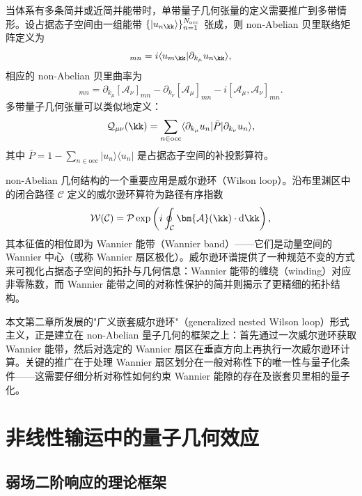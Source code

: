 当体系有多条简并或近简并能带时，单带量子几何张量的定义需要推广到多带情形。设占据态子空间由一组能带 $\{|u_{n\kk}\rangle\}_{n=1}^{N_\mathrm{occ}}$ 张成，则 non-Abelian 贝里联络矩阵定义为\cite{PhysRevLett.114.206401}
\begin{equation}
  [\mathcal{A}_\mu(\kk)]_{mn} = i\langle u_{m\kk} | \partial_{k_\mu} u_{n\kk} \rangle,
\end{equation}
相应的 non-Abelian 贝里曲率为
\begin{equation}
  [\mathcal{F}_{\mu\nu}]_{mn} = \partial_{k_\mu} [\mathcal{A}_\nu]_{mn} - \partial_{k_\nu} [\mathcal{A}_\mu]_{mn} - i[\mathcal{A}_\mu, \mathcal{A}_\nu]_{mn}.
\end{equation}
多带量子几何张量可以类似地定义：
\begin{equation}
  \mathcal{Q}_{\mu\nu}(\kk) = \sum_{n \in \mathrm{occ}} \langle \partial_{k_\mu} u_n | \bar{P} | \partial_{k_\nu} u_n \rangle,
\end{equation}
其中 $\bar{P} = 1 - \sum_{n \in \mathrm{occ}} |u_n\rangle\langle u_n|$ 是占据态子空间的补投影算符。

non-Abelian 几何结构的一个重要应用是威尔逊环（Wilson loop）。沿布里渊区中的闭合路径 $\mathcal{C}$ 定义的威尔逊环算符为路径有序指数
\begin{equation}
  \mathcal{W}(\mathcal{C}) = \mathcal{P} \exp\left( i \oint_{\mathcal{C}} \bm{\mathcal{A}}(\kk) \cdot \mathrm{d}\kk \right),
\end{equation}
其本征值的相位即为 Wannier 能带（Wannier band）——它们是动量空间的 Wannier 中心（或称 Wannier 扇区极化）。威尔逊环谱提供了一种规范不变的方式来可视化占据态子空间的拓扑与几何信息：Wannier 能带的缠绕（winding）对应非零陈数，而 Wannier 能带之间的对称性保护的简并则揭示了更精细的拓扑结构\cite{alexey1,alexey2}。

本文第二章所发展的"广义嵌套威尔逊环"（generalized nested Wilson loop）形式主义，正是建立在 non-Abelian 量子几何的框架之上：首先通过一次威尔逊环获取 Wannier 能带，然后对选定的 Wannier 扇区在垂直方向上再执行一次威尔逊环计算。关键的推广在于处理 Wannier 扇区划分在一般对称性下的唯一性与量子化条件——这需要仔细分析对称性如何约束 Wannier 能隙的存在及嵌套贝里相的量子化。


\section{非线性输运中的量子几何效应}
\label{sec:nonlinear-transport}

\subsection{弱场二阶响应的理论框架}

